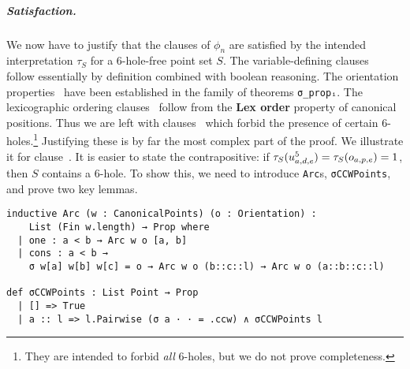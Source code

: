 

\subparagraph*{Satisfaction.}
We now have to justify that the clauses of $\phi_n$
are satisfied by the intended interpretation $\tau_S$
for a $6$-hole-free point set $S$.
The variable-defining clauses~
follow essentially by definition combined with boolean reasoning.
The orientation properties~
have been established in the family of theorems \lstinline|σ_propᵢ|.
The lexicographic ordering clauses~
follow from the \textbf{Lex order} property of canonical positions.
Thus we are left with clauses~
which forbid the presence of certain $6$-holes.\footnote{
They are intended to forbid \emph{all} $6$-holes,
but we do not prove completeness.}
Justifying these is by far the most complex
part of the proof.
We illustrate it for clause~.
It is easier to state the contrapositive:
if $\tau_S(\ufvar_{a,d,e}) = \tau_S(\orvar_{a,p,e}) = 1$,
then $S$ contains a $6$-hole.
To show this, we need to introduce \lstinline{Arc}s, \lstinline|σCCWPoints|,
and prove two key lemmas.

\begin{lstlisting}
inductive Arc (w : CanonicalPoints) (o : Orientation) :
    List (Fin w.length) → Prop where
  | one : a < b → Arc w o [a, b]
  | cons : a < b →
    σ w[a] w[b] w[c] = o → Arc w o (b::c::l) → Arc w o (a::b::c::l)

def σCCWPoints : List Point → Prop
  | [] => True
  | a :: l => l.Pairwise (σ a · · = .ccw) ∧ σCCWPoints l
\end{lstlisting}

